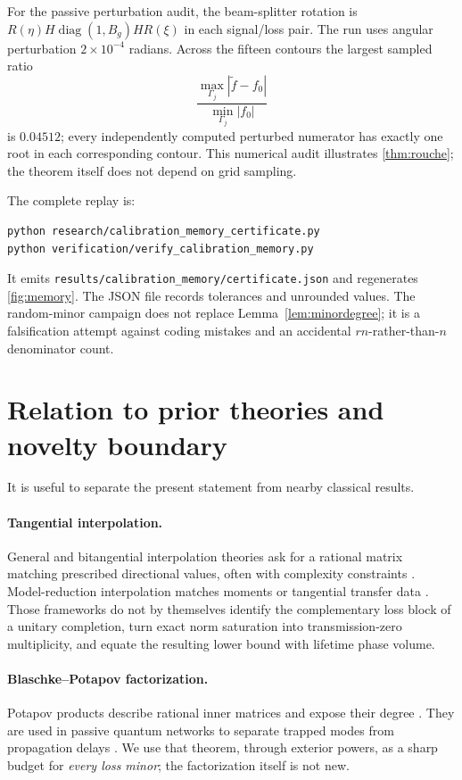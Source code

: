 \documentclass[11pt]{article}
\theoremstyle{definition}
\theoremstyle{remark}
\newcommand{\diag}{\operatorname{diag}}
\begin{document}
For the passive perturbation audit, the beam-splitter rotation is
$R(\eta)H\diag(1,B_g)HR(\xi)$ in each signal/loss pair.  The run uses angular
perturbation $2\times10^{-4}$ radians.  Across the fifteen contours the
largest sampled ratio
\begin{equation}\label{eq:rouchenumeric}
 \frac{\max_{\Gamma_j}|\widetilde f-f_0|}
 {\min_{\Gamma_j}|f_0|}
\end{equation}
is $0.04512$; every independently computed perturbed numerator has exactly
one root in each corresponding contour.  This numerical audit illustrates
\cref{thm:rouche}; the theorem itself does not depend on grid sampling.

The complete replay is:
\begin{verbatim}
python research/calibration_memory_certificate.py
python verification/verify_calibration_memory.py
\end{verbatim}
It emits
\texttt{results/calibration\_memory/certificate.json} and regenerates
\cref{fig:memory}.  The JSON file records tolerances and unrounded values.
The random-minor campaign does not replace Lemma~\ref{lem:minordegree}; it is
a falsification attempt against coding mistakes and an accidental
$rn$-rather-than-$n$ denominator count.

\section{Relation to prior theories and novelty boundary}

It is useful to separate the present statement from nearby classical results.

\paragraph{Tangential interpolation.}
General and bitangential interpolation theories ask for a rational matrix
matching prescribed directional values, often with complexity constraints
\cite{BallKang1990,BallBolotnikov2017}.  Model-reduction interpolation matches
moments or tangential transfer data \cite{GallivanEtAl2004}.  Those frameworks
do not by themselves identify the complementary loss block of a unitary
completion, turn exact norm saturation into transmission-zero multiplicity,
and equate the resulting lower bound with lifetime phase volume.

\paragraph{Blaschke--Potapov factorization.}
Potapov products describe rational inner matrices and expose their degree
\cite{Potapov1955,AlpayJorgensenLewkowicz2016}.  They are used in passive
quantum networks to separate trapped modes from propagation delays
\cite{TabakMabuchi2016}.  We use that theorem, through exterior powers, as a
sharp budget for \emph{every loss minor}; the factorization itself is not new.
\end{document}
